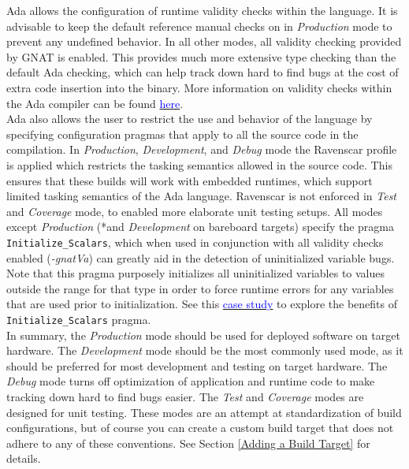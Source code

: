 Ada allows the configuration of runtime validity checks within the language. It is advisable to keep the default reference manual checks on in \textit{Production} mode to prevent any undefined behavior. In all other modes, all validity checking provided by GNAT is enabled. This provides much more extensive type checking than the default Ada checking, which can help track down hard to find bugs at the cost of extra code insertion into the binary. More information on validity checks within the Ada compiler can be found \href{https://gcc.gnu.org/onlinedocs/gcc-4.6.2/gnat_ugn_unw/Validity-Checking.html#Validity-Checking}{\textcolor{blue}{here}}. \\

Ada also allows the user to restrict the use and behavior of the language by specifying configuration pragmas that apply to all the source code in the compilation. In \textit{Production}, \textit{Development}, and \textit{Debug} mode the Ravenscar profile is applied which restricts the tasking semantics allowed in the source code. This ensures that these builds will work with embedded runtimes, which support limited tasking semantics of the Ada language. Ravenscar is not enforced in \textit{Test} and \textit{Coverage} mode, to enabled more elaborate unit testing setups. All modes except \textit{Production} (*and \textit{Development} on bareboard targets) specify the pragma \texttt{Initialize\_Scalars}, which when used in conjunction with all validity checks enabled (\textit{-gnatVa}) can greatly aid in the detection of uninitialized variable bugs. Note that this pragma purposely initializes all uninitialized variables to values outside the range for that type in order to force runtime errors for any variables that are used prior to initialization. See this \href{https://www.adacore.com/uploads/techPapers/rtchecks.pdf}{\textcolor{blue}{case study}} to explore the benefits of \texttt{Initialize\_Scalars} pragma. \\

In summary, the \textit{Production} mode should be used for deployed software on target hardware. The \textit{Development} mode should be the most commonly used mode, as it should be preferred for most development and testing on target hardware. The \textit{Debug} mode turns off optimization of application and runtime code to make tracking down hard to find bugs easier. The \textit{Test} and \textit{Coverage} modes are designed for unit testing. These modes are an attempt at standardization of build configurations, but of course you can create a custom build target that does not adhere to any of these conventions. See Section \ref{Adding a Build Target} for details. \\

